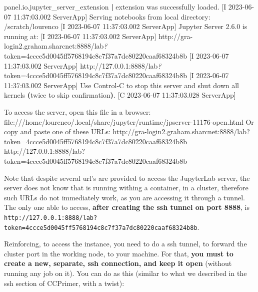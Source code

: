 \documentclass[
]{book}
\newenvironment{Shaded}{\begin{snugshade}}{\end{snugshade}}
\newcommand{\BuiltInTok}[1]{#1}
\newcommand{\ErrorTok}[1]{\textcolor[rgb]{0.64,0.00,0.00}{\textbf{#1}}}
\newcommand{\ExtensionTok}[1]{#1}
\newcommand{\KeywordTok}[1]{\textcolor[rgb]{0.13,0.29,0.53}{\textbf{#1}}}
\newcommand{\NormalTok}[1]{#1}
\newcommand{\PreprocessorTok}[1]{\textcolor[rgb]{0.56,0.35,0.01}{\textit{#1}}}
\begin{document}
\begin{Shaded}
\begin{Highlighting}[]
\ExtensionTok{[I}\NormalTok{ 2023{-}06{-}07 11:37:03.001 ServerApp] panel.io.jupyter\_server\_extension }\KeywordTok{|} \ExtensionTok{extension}\NormalTok{ was successfully loaded.}
\ExtensionTok{[I}\NormalTok{ 2023{-}06{-}07 11:37:03.002 ServerApp] Serving notebooks from local directory: /scratch/lourenco}
\ExtensionTok{[I}\NormalTok{ 2023{-}06{-}07 11:37:03.002 ServerApp] Jupyter Server 2.6.0 is running at:}
\ExtensionTok{[I}\NormalTok{ 2023{-}06{-}07 11:37:03.002 ServerApp] http://gra{-}login2.graham.sharcnet:8888/lab}\PreprocessorTok{?}\NormalTok{token=4ccce5d0045ff5768194c8c7f37a7dc80220caaf68324b8b}
\ExtensionTok{[I}\NormalTok{ 2023{-}06{-}07 11:37:03.002 ServerApp]     http://127.0.0.1:8888/lab}\PreprocessorTok{?}\NormalTok{token=4ccce5d0045ff5768194c8c7f37a7dc80220caaf68324b8b}
\ExtensionTok{[I}\NormalTok{ 2023{-}06{-}07 11:37:03.002 ServerApp] Use Control{-}C to stop this server and shut down all kernels }\ErrorTok{(}\ExtensionTok{twice}\NormalTok{ to skip confirmation}\KeywordTok{)}\BuiltInTok{.}
\ExtensionTok{[C}\NormalTok{ 2023{-}06{-}07 11:37:03.028 ServerApp] }
    
    \ExtensionTok{To}\NormalTok{ access the server, open this file in a browser:}
        \ExtensionTok{file:///home/lourenco/.local/share/jupyter/runtime/jpserver{-}11176{-}open.html}
    \ExtensionTok{Or}\NormalTok{ copy and paste one of these URLs:}
        \ExtensionTok{http://gra{-}login2.graham.sharcnet:8888/lab?token=4ccce5d0045ff5768194c8c7f37a7dc80220caaf68324b8b}
        \ExtensionTok{http://127.0.0.1:8888/lab?token=4ccce5d0045ff5768194c8c7f37a7dc80220caaf68324b8b}
\end{Highlighting}
\end{Shaded}

Note that despite several url's are provided to access the JupyterLab server, the server does not know that is running withing a container, in a cluster, therefore such URLs do not immediately work, as you are accessing it through a tunnel. The only one able to access, \textbf{after creating the ssh tunnel on port 8888}, is \texttt{http://127.0.0.1:8888/lab?token=4ccce5d0045ff5768194c8c7f37a7dc80220caaf68324b8b}.

Reinforcing, to access the instance, you need
to do a ssh tunnel, to forward the cluster port in the working node, to your machine. For that, \textbf{you must to create a new, separate, ssh connection, and keep it open} (without
running any job on it). You can do as this (similar to what we described in the ssh section of CCPrimer, with a twist):
\end{document}
